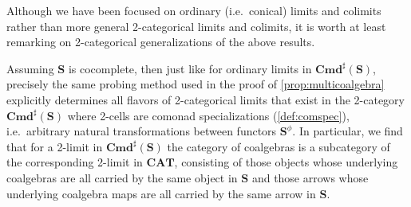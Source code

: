 \documentclass[11pt, oneside, article]{memoir}
\theoremstyle{plain}
\theoremstyle{definition}
\theoremstyle{remark}
\newenvironment{remark}
{\renewcommand\qedsymbol{$\lrcorner$}%
  \pushQED{\qed}\myremark}
{\popQED\endmyremark}
\newcommand{\namedcat}[1]{\mathbf{#1}}
\newcommand{\tcat}[1]{\mathbf{#1}}
\newcommand{\cat}[1]{\mathbf{#1}}
\newcommand{\Cat}{\namedcat{Cat}}
\newcommand{\CAT}{\namedcat{CAT}}
\newcommand{\Com}{\namedcat{Cmd}^\sharp}
\newcommand{\com}[2]{{#1}^{#2}}
\newcommand{\bS}{\cat{S}}
\newcommand{\anote}[1]{{\color{red!80!black}$\lozenge$\qquad Aaron says: #1\qquad$\lozenge$}}
\newcommand{\anoteNI}[1]{}
\begin{document}
\begin{remark}\label{rem:copowers}
  Although we have been focused on ordinary (i.e.\ conical) limits and
  colimits rather than more general 2-categorical limits and colimits,
  it is worth at least remarking on 2-categorical generalizations
  of the above results.

  Assuming $\bS$ is cocomplete, then just like for ordinary limits in
  $\Com(\bS)$, precisely the same probing method used in the proof of
  \cref{prop:multicoalgebra} explicitly determines all flavors of
  2-categorical limits that exist in the 2-category $\Com(\bS)$ where
  2-cells are comonad specializations (\cref{def:comspec}), i.e.\
  arbitrary natural transformations between functors
  $\com{\bS}{\phi}$. In particular, we find that for a 2-limit in
  $\Com(\bS)$ the category of coalgebras is a subcategory of the
  corresponding 2-limit in $\CAT$, consisting of those objects whose
  underlying coalgebras are all carried by the same object in $\bS$
  and those arrows whose underlying coalgebra maps are all carried by
  the same arrow in $\bS$.

  \anoteNI{Does the existence result for limits of accessible comonads
    \cref{prop:comonadlimit} also generalizes to 2-limits?}



\end{remark}
\end{document}
